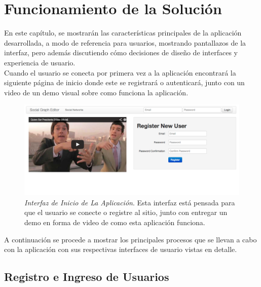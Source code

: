 \chapter{Funcionamiento de la Solución}
\label{chap:funcionamiento_solucion}

En este capítulo, se mostrarán las características principales de la aplicación desarrollada, a modo de referencia para usuarios, mostrando pantallazos de la interfaz, pero además discutiendo cómo decisiones de diseño de interfaces y experiencia de usuario.\\

Cuando el usuario se conecta por primera vez a la aplicación encontrará la siguiente página de inicio donde este se registrará o autenticará, junto con un video de un demo visual sobre como funciona la aplicación.

\begin{figure}[H]
  \centering
  \includegraphics[width=1.0\textwidth]{images/inicio.png}
  \caption[Interfaz de Inicio de La Aplicación]{\emph{Interfaz de Inicio de La Aplicación}. Esta interfaz está pensada para que el usuario se conecte o registre al sitio, junto con entregar un demo en forma de video de como esta aplicación funciona.}
  \label{inicio}
\end{figure}

A continuación se procede a mostrar los principales procesos que se llevan a cabo con la aplicación con sus respectivas interfaces de usuario vistas en detalle.


\section{Registro e Ingreso de Usuarios} %
\label{sec:registro_e_ingreso_de_usuarios}

